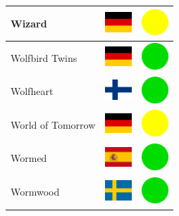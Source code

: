 \documentclass[12pt, a4paper, twoside]{report}
\begin{document}
\begin{center}
\begin{longtable}{|p{5cm}|p{2cm}|p{2cm}|}
 Wizard                                                     & \includegraphics[width=1cm]{../4x3/de} &   \includegraphics[width=1cm]{../likes/m} \\ \hline
 Wolfbird Twins                                             & \includegraphics[width=1cm]{../4x3/de} &   \includegraphics[width=1cm]{../likes/y} \\ \hline
 Wolfheart                                                  & \includegraphics[width=1cm]{../4x3/fi} &   \includegraphics[width=1cm]{../likes/y} \\ \hline
 World of Tomorrow                                          & \includegraphics[width=1cm]{../4x3/de} &   \includegraphics[width=1cm]{../likes/m} \\ \hline
 Wormed                                                     & \includegraphics[width=1cm]{../4x3/es} &   \includegraphics[width=1cm]{../likes/y} \\ \hline
 Wormwood                                                   & \includegraphics[width=1cm]{../4x3/se} &   \includegraphics[width=1cm]{../likes/y} \\ \hline

\end{longtable}
\end{center}
\end{document}
